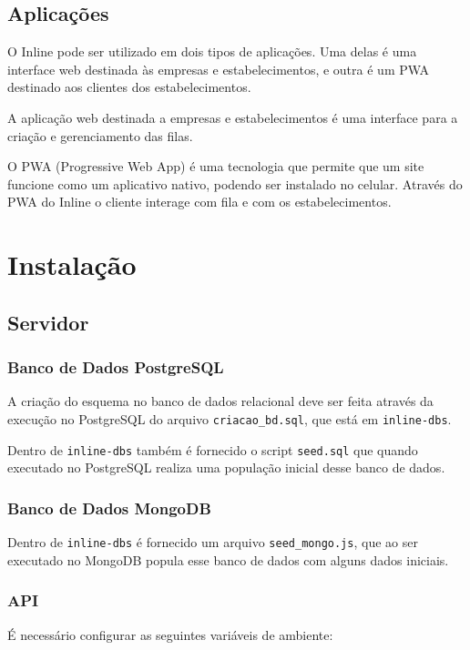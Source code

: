 \documentclass{book}
\begin{document}
\section{Aplicações}
O Inline pode ser utilizado em dois tipos de aplicações. Uma delas é uma
interface web destinada às empresas e estabelecimentos, e outra é um PWA
destinado aos clientes dos estabelecimentos.

A aplicação web destinada a empresas e estabelecimentos é uma interface para a
criação e gerenciamento das filas.

O PWA (Progressive Web App) é uma tecnologia que permite que um site funcione
como um aplicativo nativo, podendo ser instalado no celular. Através do PWA
do Inline o cliente interage com fila e com os estabelecimentos.

\chapter{Instalação}

\section{Servidor}
\subsection{Banco de Dados PostgreSQL}

A criação do esquema no banco de dados relacional deve ser feita através da
execução no PostgreSQL do arquivo \verb|criacao_bd.sql|, que está em
\verb|inline-dbs|.

Dentro de \verb|inline-dbs| também é fornecido o script \verb|seed.sql| que
quando executado no PostgreSQL realiza uma população inicial desse banco de
dados.

\subsection{Banco de Dados MongoDB}

Dentro de \verb|inline-dbs| é fornecido um arquivo \verb|seed_mongo.js|, que ao
ser executado no MongoDB popula esse banco de dados com alguns dados iniciais.

\subsection{API}
É necessário configurar as seguintes variáveis de ambiente:
\end{document}
